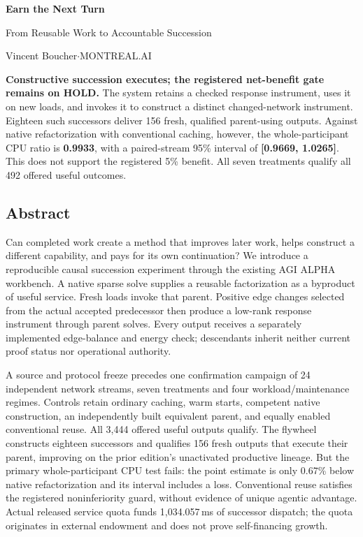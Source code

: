 \begin{center}
{\sffamily\Large\bfseries\color{purple}Earn the Next Turn}\par
\vspace{3mm}
{\large From Reusable Work to Accountable Succession}\par
\vspace{2mm}
{\small Vincent Boucher\quad $\cdot$\quad MONTREAL.AI}
\end{center}

\begin{insight}
\textbf{Constructive succession executes; the registered net-benefit gate remains on HOLD.}
The system retains a checked response instrument, uses it on new loads, and invokes it to construct a distinct
changed-network instrument. Eighteen such successors deliver 156 fresh, qualified parent-using outputs.
Against native refactorization with conventional caching, however, the whole-participant CPU ratio is
\textbf{0.9933}, with a paired-stream 95\% interval of \textbf{[0.9669, 1.0265]}. This does not support the
registered 5\% benefit. All seven treatments qualify all 492 offered useful outcomes.
\end{insight}

\subsection*{Abstract}

Can completed work create a method that improves later work, helps construct a different capability, and
pays for its own continuation? We introduce a reproducible causal succession experiment through the existing
AGI ALPHA workbench. A native sparse solve supplies a reusable factorization as a byproduct of useful service.
Fresh loads invoke that parent. Positive edge changes selected from the actual accepted predecessor then
produce a low-rank response instrument through parent solves. Every output receives a separately implemented
edge-balance and energy check; descendants inherit neither current proof status nor operational authority.

A source and protocol freeze precedes one confirmation campaign of 24 independent network streams, seven
treatments and four workload/maintenance regimes. Controls retain ordinary caching, warm starts, competent
native construction, an independently built equivalent parent, and equally enabled conventional reuse.
All 3,444 offered useful outputs qualify. The flywheel constructs eighteen successors and qualifies 156 fresh
outputs that execute their parent, improving on the prior edition's unactivated productive lineage. But the
primary whole-participant CPU test fails: the point estimate is only 0.67\% below native refactorization and its
interval includes a loss. Conventional reuse satisfies the registered noninferiority guard, without evidence
of unique agentic advantage. Actual released service quota funds 1,034.057\,ms of successor dispatch; the quota
originates in external endowment and does not prove self-financing growth.

